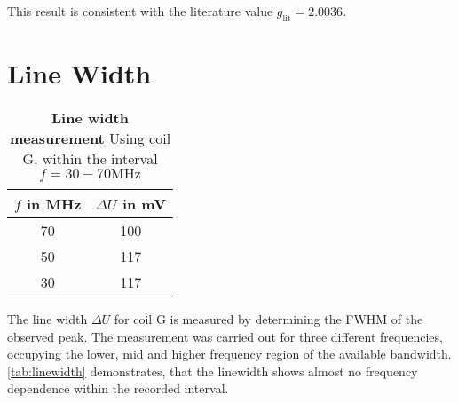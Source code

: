 This result is consistent with the literature value $g_\text{lit}%
=\num{2.0036}$\cite{g-factor}.

\section{Line Width}
\begin{table}[tbp]
	\centering
	\caption[Line width]{\textbf{Line width measurement} Using coil G, within the interval $f=30-70\si{\MHz}$}
	\label{tab:linewidth}
	\begin{tabular}{SS}
		\toprule
		{$f$ in \si{\MHz}}	&	{$\Delta U$ in \si{\mV}}	\\
			&	100	\\
		50	&	117	\\
		30	&	117	\\
		\bottomrule
	\end{tabular}
\end{table}
The line width $\Delta U$ for coil G is measured by determining the FWHM of the observed peak.
The measurement was carried out for three different frequencies, occupying the lower, mid and higher frequency region of the available bandwidth.
\autoref{tab:linewidth} demonstrates, that the linewidth shows almost no frequency dependence within the recorded interval.
